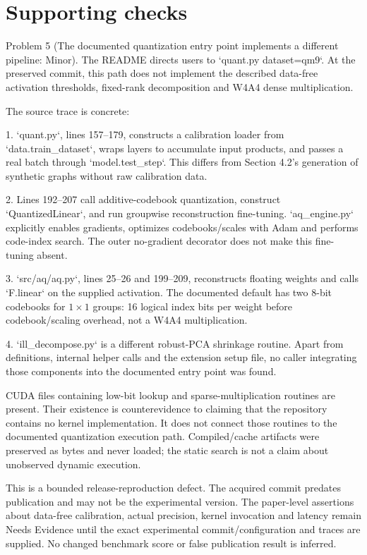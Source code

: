 \documentclass[10pt]{article}
\begin{document}
\section*{Supporting checks}
Problem 5 (The documented quantization entry point implements a different pipeline: Minor).  The README directs users to `quant.py dataset=qm9`. At the preserved commit, this path does not implement the described data-free activation thresholds, fixed-rank decomposition and W4A4 dense multiplication.\par
The source trace is concrete:\par
1. `quant.py`, lines 157–179, constructs a calibration loader from `data.train\_dataset`, wraps layers to accumulate input products, and passes a real batch through `model.test\_step`. This differs from Section 4.2’s generation of synthetic graphs without raw calibration data.\par
2. Lines 192–207 call additive-codebook quantization, construct `QuantizedLinear`, and run groupwise reconstruction fine-tuning. `aq\_engine.py` explicitly enables gradients, optimizes codebooks/scales with Adam and performs code-index search. The outer no-gradient decorator does not make this fine-tuning absent.\par
3. `src/aq/aq.py`, lines 25–26 and 199–209, reconstructs floating weights and calls `F.linear` on the supplied activation. The documented default has two 8-bit codebooks for \(1\times1\) groups: 16 logical index bits per weight before codebook/scaling overhead, not a W4A4 multiplication.\par
4. `ill\_decompose.py` is a different robust-PCA shrinkage routine. Apart from definitions, internal helper calls and the extension setup file, no caller integrating those components into the documented entry point was found.\par
CUDA files containing low-bit lookup and sparse-multiplication routines are present. Their existence is counterevidence to claiming that the repository contains no kernel implementation. It does not connect those routines to the documented quantization execution path. Compiled/cache artifacts were preserved as bytes and never loaded; the static search is not a claim about unobserved dynamic execution.\par
This is a bounded release-reproduction defect. The acquired commit predates publication and may not be the experimental version. The paper-level assertions about data-free calibration, actual precision, kernel invocation and latency remain Needs Evidence until the exact experimental commit/configuration and traces are supplied. No changed benchmark score or false publication result is inferred.\par
\end{document}
